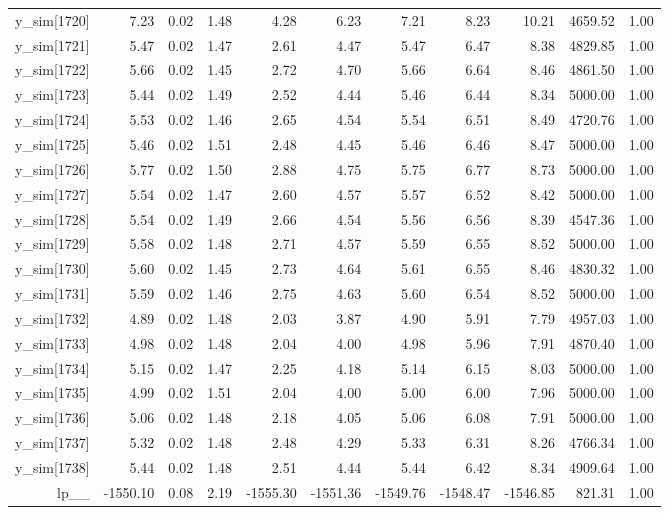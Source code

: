 \begin{table}[ht]
\begin{tabular}{rrrrrrrrrrr}
  y\_sim[1720] & 7.23 & 0.02 & 1.48 & 4.28 & 6.23 & 7.21 & 8.23 & 10.21 & 4659.52 & 1.00 \\ 
  y\_sim[1721] & 5.47 & 0.02 & 1.47 & 2.61 & 4.47 & 5.47 & 6.47 & 8.38 & 4829.85 & 1.00 \\ 
  y\_sim[1722] & 5.66 & 0.02 & 1.45 & 2.72 & 4.70 & 5.66 & 6.64 & 8.46 & 4861.50 & 1.00 \\ 
  y\_sim[1723] & 5.44 & 0.02 & 1.49 & 2.52 & 4.44 & 5.46 & 6.44 & 8.34 & 5000.00 & 1.00 \\ 
  y\_sim[1724] & 5.53 & 0.02 & 1.46 & 2.65 & 4.54 & 5.54 & 6.51 & 8.49 & 4720.76 & 1.00 \\ 
  y\_sim[1725] & 5.46 & 0.02 & 1.51 & 2.48 & 4.45 & 5.46 & 6.46 & 8.47 & 5000.00 & 1.00 \\ 
  y\_sim[1726] & 5.77 & 0.02 & 1.50 & 2.88 & 4.75 & 5.75 & 6.77 & 8.73 & 5000.00 & 1.00 \\ 
  y\_sim[1727] & 5.54 & 0.02 & 1.47 & 2.60 & 4.57 & 5.57 & 6.52 & 8.42 & 5000.00 & 1.00 \\ 
  y\_sim[1728] & 5.54 & 0.02 & 1.49 & 2.66 & 4.54 & 5.56 & 6.56 & 8.39 & 4547.36 & 1.00 \\ 
  y\_sim[1729] & 5.58 & 0.02 & 1.48 & 2.71 & 4.57 & 5.59 & 6.55 & 8.52 & 5000.00 & 1.00 \\ 
  y\_sim[1730] & 5.60 & 0.02 & 1.45 & 2.73 & 4.64 & 5.61 & 6.55 & 8.46 & 4830.32 & 1.00 \\ 
  y\_sim[1731] & 5.59 & 0.02 & 1.46 & 2.75 & 4.63 & 5.60 & 6.54 & 8.52 & 5000.00 & 1.00 \\ 
  y\_sim[1732] & 4.89 & 0.02 & 1.48 & 2.03 & 3.87 & 4.90 & 5.91 & 7.79 & 4957.03 & 1.00 \\ 
  y\_sim[1733] & 4.98 & 0.02 & 1.48 & 2.04 & 4.00 & 4.98 & 5.96 & 7.91 & 4870.40 & 1.00 \\ 
  y\_sim[1734] & 5.15 & 0.02 & 1.47 & 2.25 & 4.18 & 5.14 & 6.15 & 8.03 & 5000.00 & 1.00 \\ 
  y\_sim[1735] & 4.99 & 0.02 & 1.51 & 2.04 & 4.00 & 5.00 & 6.00 & 7.96 & 5000.00 & 1.00 \\ 
  y\_sim[1736] & 5.06 & 0.02 & 1.48 & 2.18 & 4.05 & 5.06 & 6.08 & 7.91 & 5000.00 & 1.00 \\ 
  y\_sim[1737] & 5.32 & 0.02 & 1.48 & 2.48 & 4.29 & 5.33 & 6.31 & 8.26 & 4766.34 & 1.00 \\ 
  y\_sim[1738] & 5.44 & 0.02 & 1.48 & 2.51 & 4.44 & 5.44 & 6.42 & 8.34 & 4909.64 & 1.00 \\ 
  lp\_\_ & -1550.10 & 0.08 & 2.19 & -1555.30 & -1551.36 & -1549.76 & -1548.47 & -1546.85 & 821.31 & 1.00 \\ 
   \hline
\end{tabular}
\end{table}
